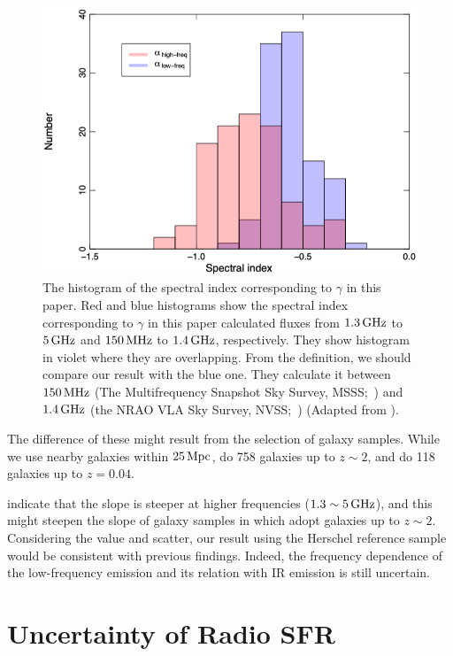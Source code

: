 \begin{figure}[htbp]
	\centering
	\includegraphics[width=.8\linewidth]{Chapter_6/Figures/Chyzy2018_Figure4.png}
    \caption[The histogram of the spectral index in \citet{Chyzy2018}]{\label{fig:Chyzy2018_figure4}
        The histogram of the spectral index corresponding to $\gamma$ in this paper.
        Red and blue histograms show the spectral index corresponding to $\gamma$ in this paper calculated fluxes from $1.3\,\mathrm{GHz}$ to $5\,\mathrm{GHz}$ and $150\,\mathrm{MHz}$ to $1.4\,\mathrm{GHz}$, respectively.
        They show histogram in violet where they are overlapping.
        From the definition, we should compare our result with the blue one.
        They calculate it between $150\,\mathrm{MHz}$ (The Multifrequency Snapshot Sky Survey, MSSS;~\citealt{Heald2015}) and $1.4\,\mathrm{GHz}$ (the NRAO VLA Sky Survey, NVSS;~\citealt{Condon1998})
        (Adapted from \citet{Chyzy2018}).
    }
\end{figure}

The difference of these might result from the selection of galaxy samples.
While we use nearby galaxies within $25\,\mathrm{Mpc}$, \citet{CalistroRivera2017a} do 758 galaxies up to $z\sim2$, and \citet{Chyzy2018} do 118 galaxies up to $z=0.04$.

\citet{Chyzy2018} indicate that the slope is steeper at higher frequencies ($1.3 \sim 5\,\mathrm{GHz}$), and this might steepen the slope of galaxy samples in \citet{CalistroRivera2017a} which adopt galaxies up to $z\sim2$.
Considering the value and scatter, our result using the Herschel reference sample would be consistent with previous findings.
Indeed, the frequency dependence of the low-frequency emission and its relation with IR emission is still uncertain.



\section{Uncertainty of Radio SFR}\label{sec:radiosfruncertainty}

